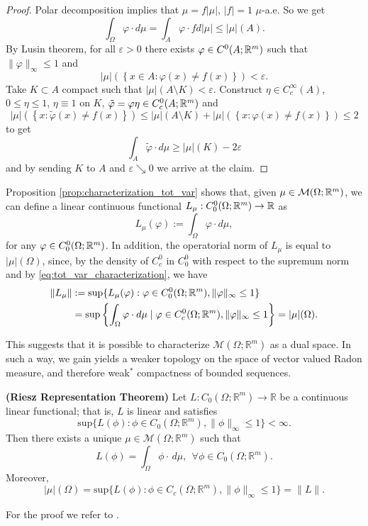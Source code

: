 \begin{proof}
Polar decomposition implies that
$\mu = f|\mu|$, $|f| =1 $ $\mu$-a.e. So we get
\[
\int_\Omega \varphi \cdot d\mu = \int_A \varphi \cdot fd|\mu| \leq |\mu|(A).
\]
By Lusin theorem, for all $\varepsilon > 0$ there exists $\varphi \in
C^0(A;\mathbb{R}^m)$ such that $\|\varphi\|_\infty \leq 1$ and 
\[
|\mu|\left(\left\{x \in A : \varphi(x) \neq f(x)\right\}\right) < \varepsilon.
\]
Take $K \subset A$ compact such that $|\mu|(A\setminus K) < \varepsilon$.
Construct $\eta \in C^\infty_c(A)$, $0 \leq \eta \leq 1$, $\eta \equiv 1$ on
$K$, $\tilde \varphi = \varphi \eta \in C^0_c(A;\mathbb{R}^m)$ and 
\[
|\mu|\left(\left\{ x: \tilde \varphi(x) \neq f(x) \right\}\right)
\leq
|\mu|(A\setminus K)
+
|\mu|\left(\left\{ x: \varphi(x) \neq f(x) \right\}\right)
\leq 2
\]
to get 
\[
\int_A \tilde \varphi \cdot d\mu \geq |\mu|(K) - 2 \varepsilon 
\]
and by sending $K$ to $A$ and $\varepsilon \searrow 0$ we arrive at the claim.
\end{proof}


Proposition \ref{prop:characterization_tot_var} shows that, given $\mu \in \mathcal{M}(\Omega;\mathbb{R}^m)$, we can define a linear continuous functional $L_{\mu} : C^{0}_{0}(\Omega; \mathbb{R}^{m}) \to \mathbb{R}$ as
\begin{equation*}
L_{\mu}(\varphi) := \int_{\Omega} \varphi \cdot d \mu,
\end{equation*}
for any $\varphi \in C^{0}_{0}(\Omega; \mathbb{R}^{m})$. In addition, the operatorial norm of $L_{\mu}$ is equal to $|\mu|(\Omega)$, since, by the density of $C^{0}_{c}$ in $C^{0}_{0}$ with respect to the supremum norm and by \eqref{eq:tot_var_characterization}, we have
\begin{align*}
\|L_{\mu}\| & := \sup\{ L_{\mu}(\varphi) : \varphi \in C^{0}_{0}(\Omega; \mathbb{R}^{m}), \|\varphi\|_{\infty} \le 1 \} \\
& = \sup\left\{ \int_\Omega \varphi \cdot d\mu \mid 
\varphi \in C^0_c(\Omega;\mathbb{R}^m), \|\varphi\|_\infty \leq 1\right\} = |\mu|(\Omega).
\end{align*}

This suggests that it is possible to characterize $\mathcal{M}(\Omega; \mathbb{R}^{m})$ as a dual space. In such a way, we gain yields a weaker topology on the space of vector valued Radon measure, and therefore weak$^{*}$ compactness of bounded sequences. 

\begin{theorem} \label{Rieszreprfin} {\bf (Riesz Representation Theorem)} 
Let $L: C_{0} (\Omega; \mathbb{R}^{m}) \to \mathbb{R}$ be a continuous linear functional; that is, $L$ is linear and satisfies
\[ \mathrm{sup} \{ L(\phi) : \phi \in C_{0} (\Omega; \mathbb{R}^{m}), \|\phi\|_{\infty} \le 1 \} < \infty. \]
Then there exists a unique $\mu \in \mathcal{M}(\Omega; \mathbb{R}^{m})$ such that
\[ L(\phi) = \int_{\Omega} \phi \cdot \, d\mu, \  \ \forall \phi \in C_{0}(\Omega; \mathbb{R}^{m}).  \]
Moreover, 
\[ |\mu|(\Omega) = \mathrm{sup}\{ L(\phi) : \phi \in C_{c}(\Omega; \mathbb{R}^{m}), \|\phi\|_{\infty} \le 1\} = \|L\|. \]
\end{theorem}
For the proof we refer to \cite[Theorem 1.54]{AFP}.


